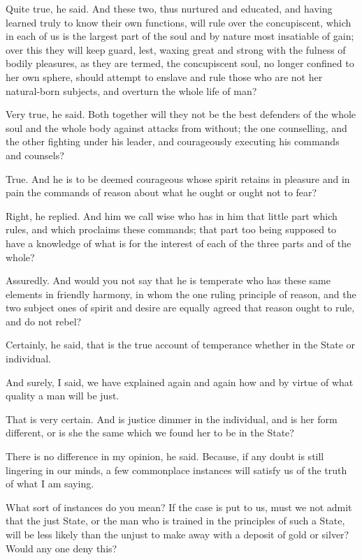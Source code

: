 Quite true, he said.
And these two, thus nurtured and educated, and having learned truly to know their own functions, will rule over the concupiscent, which in each of us is the largest part of the soul and by nature most insatiable of gain; over this they will keep guard, lest, waxing great and strong with the fulness of bodily pleasures, as they are termed, the concupiscent soul, no longer confined to her own sphere, should attempt to enslave and rule those who are not her natural-born subjects, and overturn the whole life of man?

Very true, he said.
Both together will they not be the best defenders of the whole soul and the whole body against attacks from without; the one counselling, and the other fighting under his leader, and courageously executing his commands and counsels?

True.
And he is to be deemed courageous whose spirit retains in pleasure and in pain the commands of reason about what he ought or ought not to fear?

Right, he replied.
And him we call wise who has in him that little part which rules, and which proclaims these commands; that part too being supposed to have a knowledge of what is for the interest of each of the three parts and of the whole?

Assuredly.
And would you not say that he is temperate who has these same elements in friendly harmony, in whom the one ruling principle of reason, and the two subject ones of spirit and desire are equally agreed that reason ought to rule, and do not rebel?

Certainly, he said, that is the true account of temperance whether in the State or individual.

And surely, I said, we have explained again and again how and by virtue of what quality a man will be just.

That is very certain.
And is justice dimmer in the individual, and is her form different, or is she the same which we found her to be in the State?

There is no difference in my opinion, he said.
Because, if any doubt is still lingering in our minds, a few commonplace instances will satisfy us of the truth of what I am saying.

What sort of instances do you mean?
If the case is put to us, must we not admit that the just State, or the man who is trained in the principles of such a State, will be less likely than the unjust to make away with a deposit of gold or silver? Would any one deny this?

